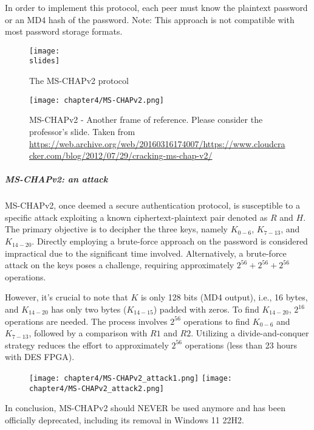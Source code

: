In order to implement this protocol, each peer must know the plaintext password or an MD4 hash of the password. Note: This approach is not compatible with most password storage formats.


\begin{figure}[H]
    \centering
    \texttt{[image: \\slides]}
    \caption{The MS-CHAPv2 protocol}
\end{figure}

\begin{figure}[H]
    \centering
    \texttt{[image: chapter4/MS-CHAPv2.png]}
    \caption{MS-CHAPv2 - Another frame of reference. Please consider the professor's slide. Taken from\\
        \url{https://web.archive.org/web/20160316174007/https://www.cloudcracker.com/blog/2012/07/29/cracking-ms-chap-v2/}}
\end{figure}


\subparagraph{MS-CHAPv2: an attack}
MS-CHAPv2, once deemed a secure authentication protocol, is susceptible to a specific attack exploiting a known ciphertext-plaintext pair denoted as \(R\) and \(H\). The primary objective is to decipher the three keys, namely \(K_{0-6}\), \(K_{7-13}\), and \(K_{14-20}\). Directly employing a brute-force approach on the password is considered impractical due to the significant time involved. Alternatively, a brute-force attack on the keys poses a challenge, requiring approximately \(2^{56} + 2^{56} + 2^{56}\) operations.

However, it's crucial to note that \(K\) is only 128 bits (MD4 output), i.e., 16 bytes, and \(K_{14-20}\) has only two bytes (\(K_{14-15}\)) padded with zeros. To find \(K_{14-20}\), \(2^{16}\) operations are needed. The process involves \(2^{56}\) operations to find \(K_{0-6}\) and \(K_{7-13}\), followed by a comparison with \(R1\) and \(R2\). Utilizing a divide-and-conquer strategy reduces the effort to approximately \(2^{56}\) operations (less than 23 hours with DES FPGA).

\begin{figure}[H]
    \centering
    \texttt{[image: chapter4/MS-CHAPv2\_attack1.png]}
    \texttt{[image: chapter4/MS-CHAPv2\_attack2.png]}
\end{figure}

In conclusion, MS-CHAPv2 should NEVER be used anymore and has been officially deprecated, including its removal in Windows 11 22H2.


